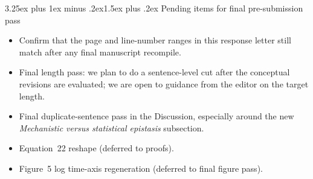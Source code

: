 \documentclass[11pt,a4paper]{article}
\makeatletter
\renewcommand{\subsection}{\@startsection{subsection}{2}{0pt}%
  {3.25ex plus 1ex minus .2ex}{1.5ex plus .2ex}%
  {\large\bfseries}}
\makeatother
\begin{document}
\subsection{Pending items for final pre-submission pass}

\begin{itemize}[leftmargin=*]
\item Confirm that the page and line-number ranges in this response letter still match after any final manuscript recompile.
\item Final length pass: we plan to do a sentence-level cut after the conceptual revisions are evaluated; we are open to guidance from the editor on the target length.
\item Final duplicate-sentence pass in the Discussion, especially around the new \textit{Mechanistic versus statistical epistasis} subsection.
\item Equation~22 reshape (deferred to proofs).
\item Figure~5 log time-axis regeneration (deferred to final figure pass).
\end{itemize}
\end{document}
